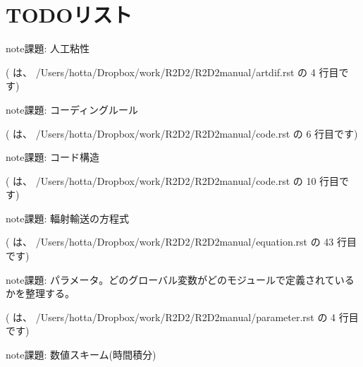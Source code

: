 \documentclass[letterpaper,10pt,dvipdfmx,report]{sphinxmanual}
\begin{document}
\chapter{TODOリスト}
\label{\detokenize{index:todo}}
\begin{sphinxadmonition}{note}{課題:}
\sphinxAtStartPar
人工粘性
\end{sphinxadmonition}

\sphinxAtStartPar
({\hyperref[\detokenize{artdif:id2}]{}} は、 /Users/hotta/Dropbox/work/R2D2/R2D2\sphinxhyphen{}manual/artdif.rst の 4 行目です)

\begin{sphinxadmonition}{note}{課題:}
\sphinxAtStartPar
コーディングルール
\end{sphinxadmonition}

\sphinxAtStartPar
({\hyperref[\detokenize{code:id3}]{}} は、 /Users/hotta/Dropbox/work/R2D2/R2D2\sphinxhyphen{}manual/code.rst の 6 行目です)

\begin{sphinxadmonition}{note}{課題:}
\sphinxAtStartPar
コード構造
\end{sphinxadmonition}

\sphinxAtStartPar
({\hyperref[\detokenize{code:id5}]{}} は、 /Users/hotta/Dropbox/work/R2D2/R2D2\sphinxhyphen{}manual/code.rst の 10 行目です)

\begin{sphinxadmonition}{note}{課題:}
\sphinxAtStartPar
輻射輸送の方程式
\end{sphinxadmonition}

\sphinxAtStartPar
({\hyperref[\detokenize{equation:id4}]{}} は、 /Users/hotta/Dropbox/work/R2D2/R2D2\sphinxhyphen{}manual/equation.rst の 43 行目です)

\begin{sphinxadmonition}{note}{課題:}
\sphinxAtStartPar
パラメータ。どのグローバル変数がどのモジュールで定義されているかを整理する。
\end{sphinxadmonition}

\sphinxAtStartPar
({\hyperref[\detokenize{parameter:id2}]{}} は、 /Users/hotta/Dropbox/work/R2D2/R2D2\sphinxhyphen{}manual/parameter.rst の 4 行目です)

\begin{sphinxadmonition}{note}{課題:}
\sphinxAtStartPar
数値スキーム(時間積分)
\end{sphinxadmonition}
\end{document}
